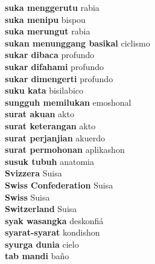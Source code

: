 \textbf{ suka menggerutu  } rabia \\
\textbf{ suka menipu  } bispou \\
\textbf{ suka merungut  } rabia \\
\textbf{ sukan menunggang basikal  } ciclismo \\
\textbf{ sukar dibaca  } profundo \\
\textbf{ sukar difahami  } profundo \\
\textbf{ sukar dimengerti  } profundo \\
\textbf{ suku kata  } bisilabico \\
\textbf{ sungguh memilukan  } emoshonal \\
\textbf{ surat akuan  } akto \\
\textbf{ surat keterangan  } akto \\
\textbf{ surat perjanjian  } akuerdo \\
\textbf{ surat permohonan  } aplikashon \\
\textbf{ susuk tubuh  } anatomia \\
\textbf{ Svizzera  } Suisa \\
\textbf{ Swiss Confederation  } Suisa \\
\textbf{ Swiss  } Suisa \\
\textbf{ Switzerland  } Suisa \\
\textbf{ syak wasangka  } deskonfiá \\
\textbf{ syarat-syarat  } kondishon \\
\textbf{ syurga dunia  } cielo \\
\textbf{ tab mandi  } baño \\
